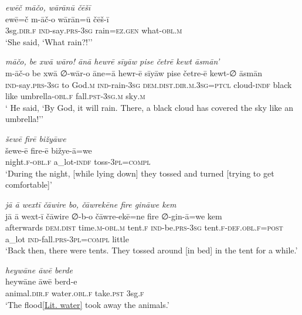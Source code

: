 \ea \label{ZB.16}
\textit{ewēč māčo, wārānū čēšī} \\ 
\gll ewē=č m-āč-o wārān=ū čēš-ī \\ 
 3sg\textsc{.dir}\textsc{.f} \textsc{ind-}say\textsc{.prs}\textsc{-3sg} rain\textsc{\textsc{=ez.gen}} what\textsc{-obl}\textsc{.m} \\ 
\glt `She said, ‘What rain?!’'
\z 
 
\ea \label{ZB.17}
\textit{māčo, be xwā wāro! ānā hewrē sīyāw pise četrē kewt āsmān’} \\ 
\gll m-āč-o be xwā ∅-wār-o āne=ā hewr-ē sīyāw pise četre-ē kewt-∅ āsmān \\ 
 \textsc{ind-}say\textsc{.prs}\textsc{-3sg} to God\textsc{.m} \textsc{ind-}rain\textsc{-3sg} \textsc{dem.dist}\textsc{.dir}\textsc{.m}\textsc{.3sg}=\textsc{ptcl} cloud\textsc{-indf} black like umbrella\textsc{-obl}\textsc{.f} fall\textsc{.pst}\textsc{-3sg}\textsc{.m} sky\textsc{.m} \\ 
\glt ` He said, ‘By God, it will rain. There, a black cloud has covered the sky like an umbrella!’'
\z 
 
\ea \label{ZB.18}
\textit{šewē firē bižyāwe} \\ 
\gll šewe-ē fire-ē bižye-ā=we \\ 
 night\textsc{.f}\textsc{-obl}\textsc{.f} a\_lot\textsc{-indf} toss\textsc{-3pl}\textsc{=compl} \\ 
\glt `During the night, [while lying down] they tossed and turned [trying to get comfortable]'
\z 
 
\ea \label{ZB.19}
\textit{jā ā wextī čāwire bo, čāwrekēne fire gināwe kem} \\ 
\gll jā ā wext-ī čāwire ∅-b-o čāwre-ekē=ne fire ∅-gin-ā=we kem \\ 
 afterwards \textsc{dem.dist} time\textsc{.m}\textsc{-obl}\textsc{.m} tent\textsc{.f} \textsc{ind-}be\textsc{.prs}\textsc{-3sg} tent\textsc{.f}\textsc{-def}\textsc{.obl}\textsc{.f}\textsc{=\textsc{post}} a\_lot \textsc{ind-}fall\textsc{.prs}\textsc{-3pl}\textsc{=compl} little \\ 
\glt `Back then, there were tents. They tossed around [in bed] in the tent for a while.'
\z 
 
\ea \label{ZB.21}
\textit{heywāne āwē berde} \\ 
\gll heywāne āwē berd-e \\ 
 animal\textsc{.dir}\textsc{.f} water\textsc{.obl}\textsc{.f} take\textsc{.pst} 3sg\textsc{.f} \\ 
\glt `The flood\ref{Lit. water} took away the animals.'
\z 
 
